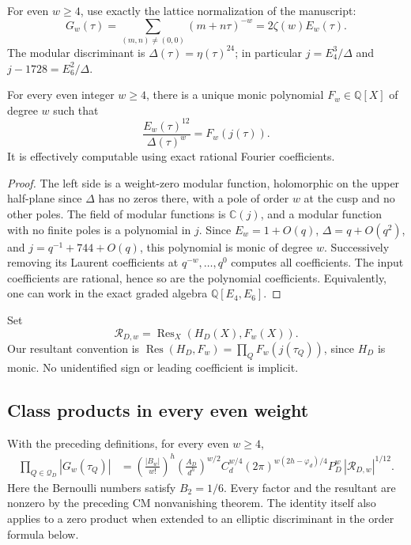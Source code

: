 For even $w\geq4$, use exactly the lattice normalization of the manuscript:
\begin{equation}
 G_w(\tau)=\sum_{(m,n)\neq(0,0)}(m+n\tau)^{-w}
 =2\zeta(w)E_w(\tau).
 \label{cmnorm:eq:G}
\end{equation}
The modular discriminant is $\Delta(\tau)=\eta(\tau)^{24}$;
in particular $j=E_4^3/\Delta$ and $j-1728=E_6^2/\Delta$.

\begin{lemma}
\label{cmnorm:lem:polynomial}
For every even integer $w\geq4$, there is a unique monic polynomial
$F_w\in\mathbb Q[X]$ of degree $w$ such that
\begin{equation}
 \frac{E_w(\tau)^{12}}{\Delta(\tau)^w}=F_w(j(\tau)).
 \label{cmnorm:eq:Fw}
\end{equation}
It is effectively computable using exact rational Fourier coefficients.
\end{lemma}
\begin{proof}
The left side is a weight-zero modular function, holomorphic on the
upper half-plane since $\Delta$ has no zeros there, with a pole of order
$w$ at the cusp and no other poles. The field of modular functions is
$\mathbb C(j)$, and a modular function with no finite poles is a
polynomial in $j$. Since $E_w=1+O(q)$, $\Delta=q+O(q^2)$, and
$j=q^{-1}+744+O(q)$, this polynomial is monic of degree $w$.
Successively removing its Laurent coefficients at $q^{-w},\ldots,q^0$
computes all coefficients. The input coefficients are rational, hence so
are the polynomial coefficients. Equivalently, one can work in the exact
graded algebra $\mathbb Q[E_4,E_6]$.
\end{proof}

Set
\[
 \mathcal R_{D,w}=\operatorname{Res}_X(H_D(X),F_w(X)).
\]
Our resultant convention is
$\operatorname{Res}(H_D,F_w)=\prod_QF_w(j(\tau_Q))$, since $H_D$
is monic. No unidentified sign or leading coefficient is implicit.




\subsection{Class products in every even weight}
\begin{theorem}
\label{cmnorm:thm:allweights}
With the preceding definitions, for every even $w\geq4$,
\begin{align}
 \prod_{Q\in\mathcal Q_D}|G_w(\tau_Q)|
 &=\left(\frac{|B_w|}{w!}\right)^h
   \left(\frac{A_D}{d^h}\right)^{w/2}
   C_d^{w/4}(2\pi)^{w(2h-\varphi_d)/4}
   P_D^w\,|\mathcal R_{D,w}|^{1/12}.
 \label{cmnorm:eq:allweights}
\end{align}
Here the Bernoulli numbers satisfy $B_2=1/6$. Every factor and the resultant are nonzero by the preceding CM
nonvanishing theorem. The identity itself also applies to a zero product
when extended to an elliptic discriminant in the order formula below.
\end{theorem}

